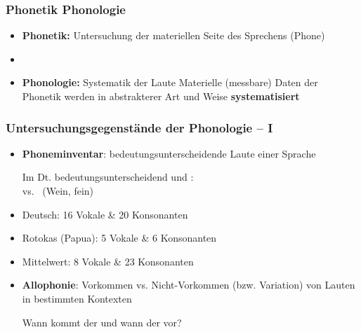 \begin{frame}
\frametitle{Phonetik \vs Phonologie}

\begin{itemize}
	\item \textbf{Phonetik:} Untersuchung der materiellen Seite des Sprechens (Phone)
	\item[]
	\item \textbf{Phonologie:} Systematik der Laute \ras Materielle (messbare) Daten der Phonetik werden in abstrakterer Art und Weise \textbf{systematisiert}
	
\end{itemize}

\end{frame}



\begin{frame}
\frametitle{Untersuchungsgegenstände der Phonologie -- I}
	
	\begin{itemize}
		\item \textbf{Phoneminventar}: bedeutungsunterscheidende Laute einer Sprache 

		\ea Im Dt. bedeutungsunterscheidend \textipa{[v]} und \textipa{[f]}: \\
		\textipa{[v\t{aI}n]} vs.\ \textipa{[f\t{aI}n]} (Wein, fein)
	\z
	
		\item Deutsch: 16 Vokale \& 20 Konsonanten
		\item Rotokas (Papua): 5 Vokale \& 6 Konsonanten
		\item Mittelwert:  8 Vokale \& 23 Konsonanten
	
		\item \textbf{Allophonie}: Vorkommen vs. Nicht-Vorkommen (bzw. Variation) von Lauten in bestimmten Kontexten

		\ea Wann kommt der  und wann der  vor?
		\z

\end{itemize}

\end{frame}


